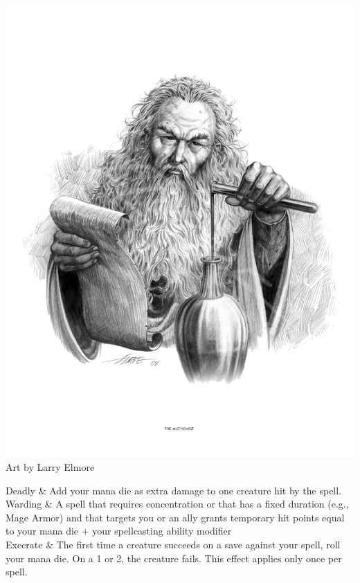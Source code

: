 \begin{multicols*}{2}
\begin{Figure}
\centering
\includegraphics[width=\textwidth]{img/wizard.png}
{\scriptsize Art by Larry Elmore}
\end{Figure}



\begin{rpg-table}
	Deadly & Add your mana die as extra damage to one creature hit by the spell.
	\\
	Warding & A spell that requires concentration or that has a fixed duration (e.g., Mage Armor) and that targets you or an ally grants temporary hit points equal to your mana die + your spellcasting ability modifier
	\\
	Execrate & The first time a creature succeeds on a save against your spell, roll your mana die. On a 1 or 2, the creature fails. This effect applies only once per spell. \\
\end{rpg-table}	
    
\end{multicols*}


